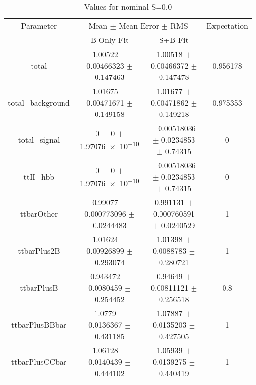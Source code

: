 \begin{table}
\centering
\caption{Values for nominal S=0.0}
\begin{tabular}{cccc}
\toprule
Parameter & \multicolumn{2}{c}{Mean $\pm$ Mean Error $\pm$ RMS} & Expectation\\
 & B-Only Fit & S+B Fit & \\
\midrule
total & \num{1.00522} $\pm$ \num{0.00466323} $\pm$ \num{0.147463} & \num{1.00518} $\pm$ \num{0.00466372} $\pm$ \num{0.147478} & \num{0.956178}\\
total\_background & \num{1.01675} $\pm$ \num{0.00471671} $\pm$ \num{0.149158} & \num{1.01677} $\pm$ \num{0.00471862} $\pm$ \num{0.149218} & \num{0.975353}\\
total\_signal & \num{0} $\pm$ \num{0} $\pm$ \num{1.97076e-10} & \num{-0.00518036} $\pm$ \num{0.0234853} $\pm$ \num{0.74315} & \num{0}\\
ttH\_hbb & \num{0} $\pm$ \num{0} $\pm$ \num{1.97076e-10} & \num{-0.00518036} $\pm$ \num{0.0234853} $\pm$ \num{0.74315} & \num{0}\\
ttbarOther & \num{0.99077} $\pm$ \num{0.000773096} $\pm$ \num{0.0244483} & \num{0.991131} $\pm$ \num{0.000760591} $\pm$ \num{0.0240529} & \num{1}\\
ttbarPlus2B & \num{1.01624} $\pm$ \num{0.00926899} $\pm$ \num{0.293074} & \num{1.01398} $\pm$ \num{0.0088783} $\pm$ \num{0.280721} & \num{1}\\
ttbarPlusB & \num{0.943472} $\pm$ \num{0.0080459} $\pm$ \num{0.254452} & \num{0.94649} $\pm$ \num{0.00811121} $\pm$ \num{0.256518} & \num{0.8}\\
ttbarPlusBBbar & \num{1.0779} $\pm$ \num{0.0136367} $\pm$ \num{0.431185} & \num{1.07887} $\pm$ \num{0.0135203} $\pm$ \num{0.427505} & \num{1}\\
ttbarPlusCCbar & \num{1.06128} $\pm$ \num{0.0140439} $\pm$ \num{0.444102} & \num{1.05939} $\pm$ \num{0.0139275} $\pm$ \num{0.440419} & \num{1}\\
\bottomrule
\end{tabular}
\end{table}